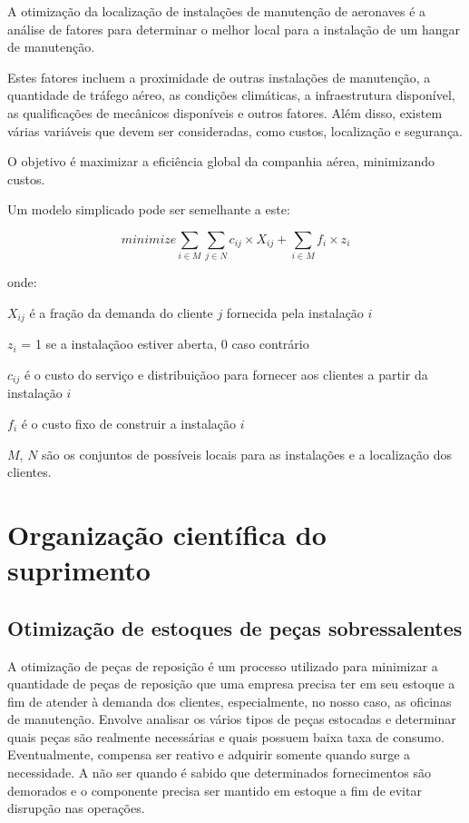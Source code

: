 \documentclass{article}
\begin{document}
A otimização da localização de instalações de manutenção de aeronaves é a análise de fatores para determinar o melhor local para a instalação de um hangar de manutenção.

Estes fatores incluem a proximidade de outras instalações de manutenção, a quantidade de tráfego aéreo, as condições climáticas, a infraestrutura disponível, as qualificações de mecânicos disponíveis e outros fatores. Além disso, existem várias variáveis que devem ser consideradas, como custos, localização e segurança.

O objetivo é maximizar a eficiência global da companhia aérea, minimizando custos.

Um modelo simplicado pode ser semelhante a este:


\begin{equation} \label{eq:fo3}
minimize \sum_{i \in M} \sum_{j \in N} c_{ij} \times X_{ij} + \sum_{i \in M} f_i \times z_i
\end{equation}

onde:

$X_{ij}$ é a fração da demanda do cliente $j$ fornecida pela instalação $i$

$z_i$ = 1 se a instalaçãoo estiver aberta, 0 caso contrário

$c_{ij}$ é o custo do serviço e distribuiçãoo para fornecer aos clientes a partir da instalação $i$

$f_i$ é o custo fixo de construir a instalação $i$

$M$, $N$ são os conjuntos de possíveis locais para as instalações e a localização dos clientes.


\section{Organização científica do suprimento}


\subsection{Otimização de estoques de peças sobressalentes}

A otimização de peças de reposição é um processo utilizado para minimizar a quantidade de peças de reposição que uma empresa precisa ter em seu estoque a fim de atender à demanda dos clientes, especialmente, no nosso caso, as oficinas de manutenção. Envolve analisar os vários tipos de peças estocadas e determinar quais peças são realmente necessárias e quais possuem baixa taxa de consumo. Eventualmente, compensa ser reativo e adquirir somente quando surge a necessidade. A não ser quando é sabido que determinados fornecimentos são demorados e o componente precisa ser mantido em estoque a fim de evitar disrupção nas operações.
\end{document}
